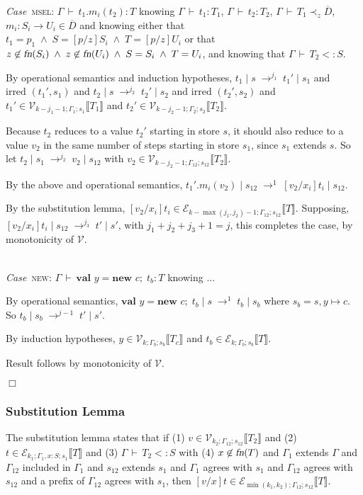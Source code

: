 \documentclass[9pt]{sigplanconf}
\newenvironment{myproof}{{\em Proof:}}{$\Box$}
\newcommand{\Case}{{\em Case\ }}
\newcommand{\ts}{\,\vdash\,}
\newcommand{\fn}{\mbox{\sl fn}}
\newcommand{\expand}{\prec}
\newcommand{\sub}{<:}
\newcommand{\tfun}{\rightarrow}
\newcommand{\seq}[1]{\overline{#1}}
\newcommand{\subst}[3]{[#1/#2]#3}
\newcommand{\new}[3]{\textbf{val }#1 = \textbf{new }#2 ;\; #3}
\newcommand{\mdecl}[3]{#1 : #2 \tfun #3}
\newcommand{\envplus}[1]{, #1}
\newcommand{\relv}[4]{\mathcal{V}_{#1;#2;#3}\llbracket#4\rrbracket}
\newcommand{\rele}[4]{\mathcal{E}_{#1;#2;#3}\llbracket#4\rrbracket}
\newcommand{\irred}[2]{\text{irred }(#1,#2)}
\newcommand{\andl}{\;\wedge\;}
\newcommand{\reductionl}[5]{#1 \operatorname{|} #2 \;\rightarrow^{#5}\; #3 \operatorname{|} #4}
\begin{document}
\begin{myproof}
\Case \textsc{msel}: $\Gamma \ts t_1.m_i(t_2) : T$ knowing $\Gamma \ts
t_1 : T_1$, $\Gamma \ts t_2 : T_2$, $\Gamma \ts T_1 \expand_z
\seq{D}$, $\mdecl {m_i} {S_i} {U_i} \in \seq{D}$ and knowing either
that $t_1 = p_1 \andl S = \subst p z {S_i} \andl T = \subst p z {U_i}$
or that $z \not\in \fn(S_i) \andl z \not\in \fn(U_i) \andl S = S_i \andl
T = U_i$, and knowing that $\Gamma \ts T_2 \sub S$.

By operational semantics and induction hypotheses, $\reductionl {t_1}
s {t_1'} {s_1} {j_1}$ and $\irred {t_1'} {s_1}$ and $\reductionl {t_2}
{s} {t_2'} {s_2} {j_2}$ and $\irred {t_2'} {s_2}$ and ${t_1'} \in
\relv {k-j_1-1} {\Gamma_1} {s_1} {T_1}$ and ${t_2'} \in \relv
{k-j_2-1} {\Gamma_2} {s_2} {T_2}$.

Because $t_2$ reduces to a value $t_2'$ starting in store $s$, it
should also reduce to a value $v_2$ in the same number of steps
starting in store $s_1$, since $s_1$ extends $s$. So let $\reductionl
{t_2} {s_1} {v_2} {s_{12}} {j_2}$ with $v_2 \in \relv {k-j_2-1}
{\Gamma_{12}} {s_{12}} {T_2}$.

By the above and operational semantics, $\reductionl {t_1'.m_i(v_2)}
{s_{12}} {\subst {v_2} {x_i} {t_i}} {s_{12}} 1$.

By the substitution lemma, ${\subst {v_2} {x_i} {t_i}} \in \rele
{k-\max(j_1,j_2)-1} {\Gamma_{12}} {s_{12}} {T}$. Supposing,
$\reductionl {\subst {v_2} {x_i} {t_i}} {s_{12}} {t'} {s'} {j_3}$,
with $j_1 + j_2 + j_3 + 1 = j$, this completes the case, by
monotonicity of $\mathcal{V}$.

\ \\

\Case \textsc{new}: $\Gamma \ts \new y c {t_b} : T$ knowing ...

By operational semantics, $\reductionl {\new y c {t_b}} s {t_b} {s_b} 1$
where $s_b = s \envplus{y \mapsto c}$. So $\reductionl {t_b} {s_b} {t'}
{s'} {j-1}$.

By induction hypotheses, $y \in \relv k {\Gamma_b} {s_b} {T_c}$ and $t_b \in
\rele k {\Gamma_b} {s_b} {T}$.

Result follows by monotonicity of $\mathcal{V}$.

\end{myproof}

\subsubsection{Substitution Lemma}

The substitution lemma states that if (1) $v \in \relv {k_2}
{\Gamma_{12}} {s_{12}} {T_2}$ and (2) $t \in \rele {k_1} {\Gamma_1
  \envplus{{x} : S}} {s_1} T$ and (3) $\Gamma \ts {T_2} \sub S$ with
(4) $x \not\in \fn(T)$ and $\Gamma_1$ extends $\Gamma$ and
$\Gamma_{12}$ included in $\Gamma_1$ and $s_{12}$ extends $s_1$ and
$\Gamma_1$ agrees with $s_1$ and $\Gamma_{12}$ agrees with $s_{12}$
and a prefix of $\Gamma_{12}$ agrees with $s_1$, then $\subst {v} {x}
{t} \in \rele {\min(k_1,k_2)} {\Gamma_{12}} {s_{12}} T$.
\end{document}
